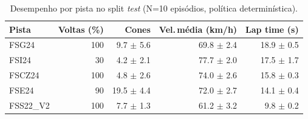 \begin{table}[H]
\centering
\caption{Desempenho por pista no split \textit{test} (N=10 episódios, política determinística).}
\label{tab:per_track_test}
\begin{tabular}{lrrrr}
\toprule
\textbf{Pista} & \textbf{Voltas (\%)} & \textbf{Cones} & \textbf{Vel.\,m\'edia (km/h)} & \textbf{Lap time (s)} \\
\midrule
FSG24 & 100 & 9.7 $\pm$ 5.6 & 69.8 $\pm$ 2.4 & 18.9 $\pm$ 0.5 \\
FSI24 & 30 & 4.2 $\pm$ 2.1 & 77.7 $\pm$ 2.0 & 17.5 $\pm$ 1.7 \\
FSCZ24 & 100 & 4.8 $\pm$ 2.6 & 74.0 $\pm$ 2.6 & 15.8 $\pm$ 0.3 \\
FSE24 & 90 & 19.5 $\pm$ 4.4 & 72.0 $\pm$ 2.7 & 14.1 $\pm$ 0.4 \\
FSS22_V2 & 100 & 7.7 $\pm$ 1.3 & 61.2 $\pm$ 3.2 & 9.8 $\pm$ 0.2 \\
\bottomrule
\end{tabular}
\end{table}
